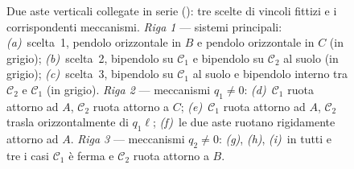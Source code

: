 \begin{figure}[!ht]
		\caption{Due aste verticali collegate in serie
			(): tre scelte di
			vincoli fittizi e i corrispondenti meccanismi.
			\emph{Riga 1} --- sistemi principali:
			\emph{(a)}~scelta~1, pendolo orizzontale in $B$
			e pendolo orizzontale in $C$ (in grigio);
			\emph{(b)}~scelta~2, bipendolo su $\mathcal{C}_1$
			e bipendolo su $\mathcal{C}_2$ al suolo (in grigio);
			\emph{(c)}~scelta~3, bipendolo su $\mathcal{C}_1$
			al suolo e bipendolo interno tra $\mathcal{C}_2$
			e $\mathcal{C}_1$ (in grigio).
			\emph{Riga 2} --- meccanismi $q_1 \neq 0$:
			\emph{(d)}~$\mathcal{C}_1$ ruota attorno ad $A$,
			$\mathcal{C}_2$ ruota attorno a $C$;
			\emph{(e)}~$\mathcal{C}_1$ ruota attorno ad $A$,
			$\mathcal{C}_2$ trasla orizzontalmente di
			$q_1\ell$;
			\emph{(f)}~le due aste ruotano rigidamente
			attorno ad $A$.
			\emph{Riga 3} --- meccanismi $q_2 \neq 0$:
			\emph{(g)}, \emph{(h)}, \emph{(i)}~in tutti
			e tre i casi $\mathcal{C}_1$ è ferma e
			$\mathcal{C}_2$ ruota attorno a $B$.}
		\label{fig:scelte_fittizi}
	\end{figure}
